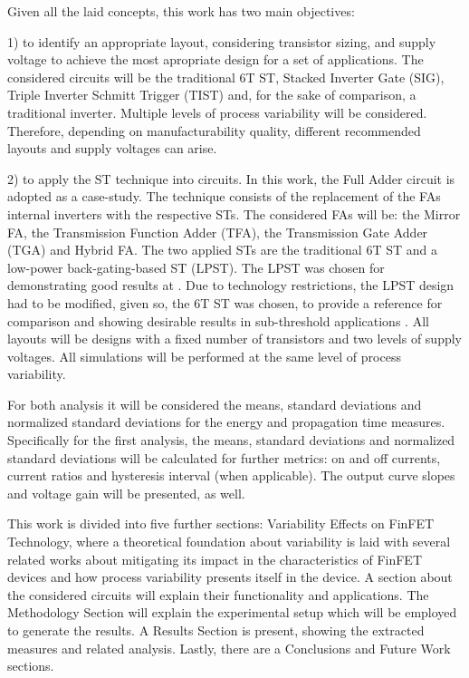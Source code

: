\documentclass[pgmicro,diss,english]{iiufrgs}
\begin{document}
	Given all the laid concepts, this work has two main objectives:

	1) to identify an appropriate layout, considering transistor sizing, and supply voltage to achieve the most apropriate design for a set of applications. The considered circuits will be the traditional 6T ST, Stacked Inverter Gate (SIG), Triple Inverter Schmitt Trigger (TIST) and, for the sake of comparison, a traditional inverter. Multiple levels of process variability will be considered. Therefore, depending on manufacturability quality, different recommended layouts and supply voltages can arise.

	2) to apply the ST technique into circuits. In this work, the Full Adder circuit is adopted as a case-study. The technique consists of the replacement of the FAs internal inverters with the respective STs. The considered FAs will be: the Mirror FA, the Transmission Function Adder (TFA), the Transmission Gate Adder (TGA) and Hybrid FA. The two applied STs are the traditional 6T ST and a low-power back-gating-based ST (LPST). The LPST was chosen for demonstrating good results at \cite{dokania2015circuit}. Due to technology restrictions, the LPST design had to be modified, given so, the 6T ST was chosen, to provide a reference for comparison and showing desirable results in sub-threshold applications \cite{lotze2017ultra}. All layouts will be designs with a fixed number of transistors and two levels of supply voltages. All simulations will be performed at the same level of process variability.

For both analysis it will be considered the means, standard deviations and normalized standard deviations for the energy and propagation time measures. Specifically for the first analysis, the means, standard deviations and normalized standard deviations will be calculated for further metrics: on and off currents, current ratios and hysteresis interval (when applicable). The output curve slopes and voltage gain will be presented, as well.

    This work is divided into five further sections: Variability Effects on FinFET Technology, where a theoretical foundation about variability is laid with several related works about mitigating its impact in the characteristics of FinFET devices and how process variability presents itself in the device. A section about the considered circuits will explain their functionality and applications. The Methodology Section will explain the experimental setup which will be employed to generate the results. A Results Section is present, showing the extracted measures and related analysis. Lastly, there are a Conclusions and Future Work sections.
\end{document}
